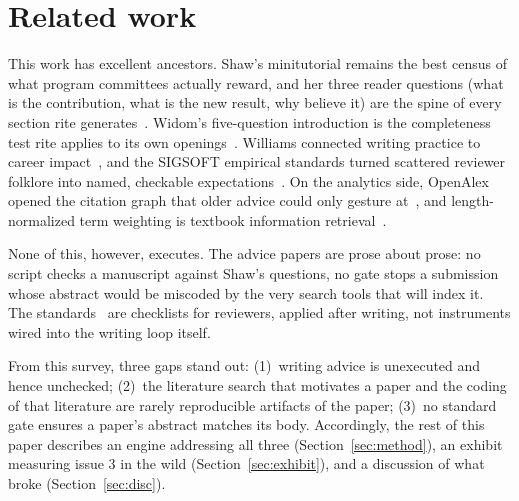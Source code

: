 \section{Related work}

This work has excellent ancestors.
Shaw's minitutorial remains the best census of what program committees
actually reward, and her three reader questions (what is the
contribution, what is the new result, why believe it) are the spine of
every section rite generates~\cite{shaw03}.
Widom's five-question introduction is the completeness test rite
applies to its own openings~\cite{widom06}.
Williams connected writing practice to career
impact~\cite{williams11}, and the SIGSOFT empirical standards turned
scattered reviewer folklore into named, checkable
expectations~\cite{ralph21}.
On the analytics side, OpenAlex opened the citation graph that older
advice could only gesture at~\cite{priem22}, and length-normalized
term weighting is textbook information retrieval~\cite{salton88}.

None of this, however, executes.
The advice papers are prose about prose: no script checks a manuscript
against Shaw's questions, no gate stops a submission whose abstract
would be miscoded by the very search tools that will index it.
The standards~\cite{ralph21} are checklists for reviewers, applied
after writing, not instruments wired into the writing loop itself.

From this survey, three gaps stand out: (1)~writing advice is
unexecuted and hence unchecked; (2)~the literature search that
motivates a paper and the coding of that literature are rarely
reproducible artifacts of the paper; (3)~no standard gate ensures a
paper's abstract matches its body.
Accordingly, the rest of this paper describes an engine addressing all
three (Section~\ref{sec:method}), an exhibit measuring issue 3 in the
wild (Section~\ref{sec:exhibit}), and a discussion of what broke
(Section~\ref{sec:disc}).
